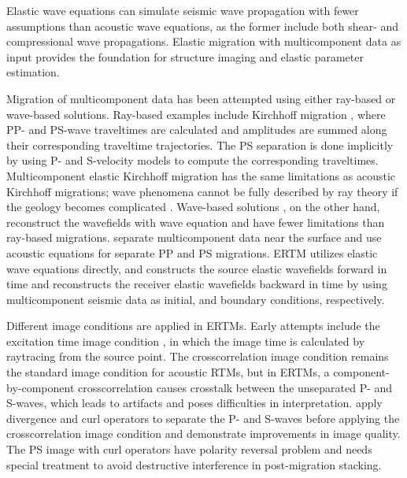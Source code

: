 \documentclass[manuscript,ulem,graphix,revised]{geophysics}
\begin{document}
Elastic wave equations can simulate seismic wave propagation with fewer assumptions than acoustic wave equations, as the former include both shear- and compressional wave propagations. Elastic migration with multicomponent data as input provides the foundation for structure imaging and elastic parameter estimation.

Migration of multicomponent data has been attempted using either ray-based or wave-based solutions. Ray-based examples include Kirchhoff migration \citep{kuo84, dai86, hokstad00}, where PP- and PS-wave traveltimes are calculated and amplitudes are summed along their corresponding traveltime trajectories. The PS separation is done implicitly by using P- and S-velocity models to compute the corresponding traveltimes. Multicomponent elastic Kirchhoff migration has the same limitations as acoustic Kirchhoff migrations; wave phenomena cannot be fully described by ray theory if the geology becomes complicated \citep{gray01}. Wave-based solutions \citep{chang86,chang94,whitmore95}, on the other hand, reconstruct the wavefields with wave equation \citep{wapenaar90} and have fewer limitations than ray-based migrations. \citet{sun01} separate multicomponent data near the surface and use acoustic equations for separate PP and PS migrations. ERTM utilizes elastic wave equations directly, and constructs the source elastic wavefields forward in time and reconstructs the receiver elastic wavefields backward in time by using multicomponent seismic data as initial, and boundary conditions, respectively.

Different image conditions are applied in ERTMs. Early attempts include the excitation time image condition \citep{chang86}, in which the image time is calculated by raytracing from the source point. The crosscorrelation image condition \citep{claerbout85} remains the standard image condition for acoustic RTMs, but in ERTMs, a component-by-component crosscorrelation causes crosstalk between the unseparated P- and S-waves, which leads to artifacts and poses difficulties in interpretation. \citet{yan08} apply divergence and curl operators to separate the P- and S-waves before applying the crosscorrelation image condition and demonstrate improvements in image quality. The PS image with curl operators have polarity reversal problem and needs special treatment \citep{du12} to avoid destructive interference in post-migration stacking.
\end{document}
